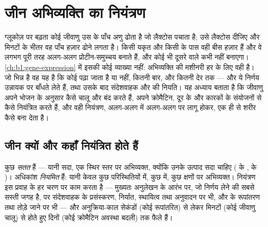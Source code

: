 \chapter{जीन अभिव्यक्ति का नियंत्रण}\label{ch:b1:expression-control}

ग्लूकोज़ पर बढ़ता कोई जीवाणु उस  के पाँच अणु ढोता है जो लैक्टोस
पचाता है; उसे लैक्टोस दीजिए और मिनटों के भीतर वह पाँच हज़ार ढोने लगता
है। किसी यकृत  और किसी  के पास वही बीस हज़ार  हैं और वे
लगभग पूरी तरह अलग-अलग प्रोटीन-समुच्चय बनाते हैं, और कोई भी दूसरे वाले
कभी नहीं बनाएगा। \cref{ch:b1:gene-expression} में इसकी कोई व्याख्या नहीं:
अभिव्यक्ति की मशीनरी हर  के लिए वही है। जो भिन्न है वह यह है कि कोई
 पढ़ा जाता है या नहीं, कितनी बार, और कितनी देर तक --- और ये निर्णय
उन्नायक पर  बाँधते  लेते हैं, तथा उसके बाद संदेशवाहक और 
की नियति। यह अध्याय बताता है कि जीवाणु अपने भोजन के अनुसार  कैसे चालू
और बंद करते हैं,  अपने  क्रोमैटिन, दूर के  और कारकों
के संयोजनों से कैसे नियंत्रित करते हैं, और वही नियंत्रण, अलग-अलग
 में अलग-अलग  पर लागू होकर, एक ही  से शरीर कैसे बना
देता है।

\section{जीन क्यों और कहाँ नियंत्रित होते हैं}

\begin{proposition}[अभिव्यक्ति हर स्तर पर नियमित होती है]\label{prop:b1:expression-control:levels}
कुछ  \emph{सतत} हैं --- यानी सदा, एक स्थिर स्तर पर अभिव्यक्त, क्योंकि
उनके उत्पाद सदा चाहिए ( के ,  के )।
अधिकांश \emph{नियमित} हैं: यानी केवल कुछ परिस्थितियों में, कुछ 
में, कुछ क्षणों पर अभिव्यक्त। नियंत्रण इस प्रवाह के हर चरण पर काम करता है
--- मुख्यतः अनुलेखन के आरंभ पर, जो निर्णय लेने की सबसे सस्ती जगह है, पर
संदेशवाहक के प्रसंस्करण, निर्यात, स्थायित्व तथा अनुवादन पर भी, और
 के रूपांतरण तथा तोड़े जाने पर भी --- और अनुक्रिया-काल सेकंडों
(कोई  रूपांतरित) से लेकर मिनटों (कोई जीवाणु  चालू) से होते हुए
दिनों (कोई क्रोमैटिन अवस्था बदली) तक फैले हैं।
\end{proposition}

